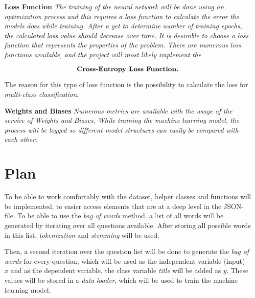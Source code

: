         \begin{tcolorbox}
            \textbf{Loss Function}
            \textit{
                The training of the neural network will be done using an optimization process and this requires a loss function to calculate the error the models does while training.
                After a yet to determine number of training epochs, the calculated loss value should decrease over time.
                It is desirable to choose a loss function that represents the properties of the problem.
                There are numerous loss functions available, and the project will most likely implement the 
                }

                $$\text{\textbf{Cross-Entropy Loss Function.}}$$

                The reason for this type of loss function is the possibility to calculate the loss for \emph{multi-class classification}.
        \end{tcolorbox}

        \begin{tcolorbox}
            \textbf{Weights and Biases}
            \textit{
                Numerous metrics are available with the usage of the service of Weights and Biases.
                While training the machine learning model, the process will be logged so different model structures can easily be compared with each other.
                }
        \end{tcolorbox}
  
        

\section{Plan}
\label{sec:plan}
        To be able to work comfortably with the dataset, helper classes and functions will be implemented, to easier access elements that are at a deep level in the JSON-file.
        To be able to use the \emph{bag of words} method, a list of all words will be generated by iterating over all questions available.
        After storing all possible words in this list, \emph{tokenization} and \emph{stemming} will be used.

        Then, a second iteration over the question list will be done to generate the \emph{bag of words} for every question, which will be used as the independent variable (input) $x$ and as the dependent variable, the class variable \emph{title} will be added as $y$. 
        These values will be stored in a \emph{data loader}, which will be used to train the machine learning model.


